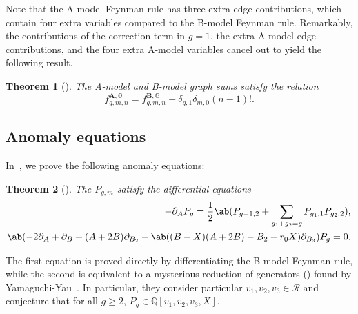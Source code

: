 \documentclass[10pt]{amsart}
\newtheorem{thm}{Theorem}[section]
\theoremstyle{definition}
\theoremstyle{remark}
\theoremstyle{plain}
\theoremstyle{definition}
\theoremstyle{remark}
\newcommand{\G}{\mathbb{G}}
\newcommand{\Q}{\mathbb{Q}}
\newcommand{\bA}{\mathbf{A}}
\newcommand{\bB}{\mathbf{B}}
\newcommand{\msc}[1]{\mathscr{#1}}
\newcommand{\1}{\mathbf{1}}
\newcommand{\2}{\mathbf{2}}
\newcommand{\3}{\mathbf{3}}
\numberwithin{equation}{section}
\begin{document}
Note that the A-model Feynman rule has three extra edge contributions, which contain four extra variables compared to the B-model Feynman rule. Remarkably, the contributions of the correction term in $g=1$, the extra A-model edge contributions, and the four extra A-model variables cancel out to yield the following result.

\begin{thm}[]\label{thm:aequalsbintro}
    The A-model and B-model graph sums satisfy the relation
    \[ f_{g,m,n}^{\bA, \G} = f_{g,m,n}^{\bB, \G} + \delta_{g,1} \delta_{m,0} (n-1)!. \]
\end{thm}

\subsection{Anomaly equations}%
\label{sub:Anomaly equations}

In~, we prove the following anomaly equations:
\begin{thm}[]\label{thm:haeintro}
    The $P_{g,m}$ satisfy the differential equations
    \begin{align*}
    - \partial_{A} P_g = \frac{1}{2} \ab(P_{g-1,2} + \sum_{g_1+g_2 = g} P_{g_1, 1} P_{g_2, 2}),  \\
    \ab(-2 \partial_{A} + \partial_{B} + (A+2B) \partial_{B_2} - \ab((B-X)(A+2B)-B_2-r_0 X)\partial_{B_3})P_g = 0.
    \end{align*}
\end{thm}

The first equation is proved directly by differentiating the B-model Feynman rule, while the second is equivalent to a mysterious reduction of generators () found by Yamaguchi-Yau~\cite{yy04}. In particular, they consider particular $v_1, v_2, v_3 \in \msc{R}$ and conjecture that for all $g \geq 2$, $P_g \in \Q[v_1, v_2, v_3, X]$.
\end{document}
